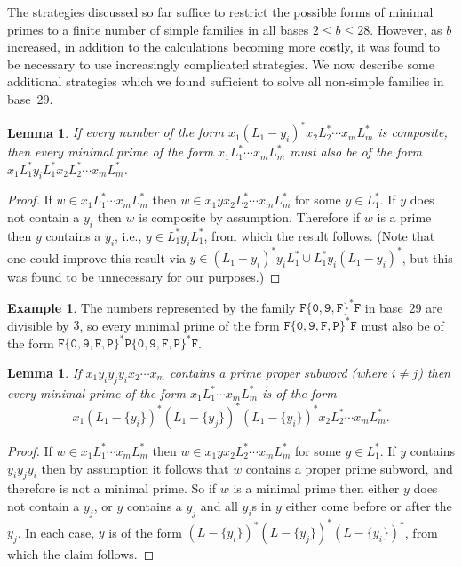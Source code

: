\documentclass[12pt]{article}
\theoremstyle{plain}
\newtheorem{lemma}[theorem]{Lemma}
\theoremstyle{definition}
\newtheorem{example}[theorem]{Example}
\newcommand{\0}{\mathtt{0}}
\newcommand{\1}{\mathtt{1}}
\newcommand{\2}{\mathtt{2}}
\newcommand{\3}{\mathtt{3}}
\newcommand{\4}{\mathtt{4}}
\newcommand{\5}{\mathtt{5}}
\newcommand{\6}{\mathtt{6}}
\newcommand{\7}{\mathtt{7}}
\newcommand{\8}{\mathtt{8}}
\newcommand{\9}{\mathtt{9}}
\begin{document}
The strategies discussed so far suffice to restrict the possible forms of minimal primes to a finite number of simple families in all bases $2\leq b\leq 28$.
However, as $b$ increased, in addition to the calculations becoming more costly, 
it was found to be necessary to use increasingly complicated strategies.
We now describe some additional strategies which we found sufficient to solve all non-simple families in base~29.
\begin{lemma}
If every number of the form\/ $x_1(L_1-y_i)^*x_2L_2^*\dotsm x_mL_m^*$ is composite, then
every minimal prime of the form\/ $x_1L_1^*\dotsm x_mL_m^*$ must also be of the form\/
$x_1L_1^*y_iL_1^*x_2L_2^*\dotsm x_mL_m^*$.
\end{lemma}
\begin{proof}
If $w\in x_1L_1^*\dotsm x_mL_m^*$ then $w\in x_1yx_2L_2^*\dotsm x_mL_m^*$ for some $y\in L_1^*$.  If $y$ does not contain a $y_i$
then $w$ is composite by assumption.  Therefore if $w$ is a prime then $y$ contains a $y_i$, i.e., $y\in L_1^*y_iL_1^*$, from which the
result follows.
(Note that one could improve this result via $y\in(L_1-y_i)^*y_iL_1^*\cup L_1^*y_i(L_1-y_i)^*$, but this was found to be unnecessary for our purposes.)
\end{proof}
\begin{example}
The numbers represented by the family $\mathtt{F}\{\0,\9,\mathtt{F}\}^*\mathtt{F}$ in base~29 are divisible by $3$,
so every minimal prime of the form $\mathtt{F}\{\0,\9,\mathtt{F},\mathtt{P}\}^*\mathtt{F}$ must also be of the form
$\mathtt{F}\{\0,\9,\mathtt{F},\mathtt{P}\}^*\mathtt{P}\{\0,\9,\mathtt{F},\mathtt{P}\}^*\mathtt{F}$.
\end{example}
\begin{lemma}
If\/ $x_1y_iy_jy_ix_2\dotsm x_m$ contains a prime proper subword (where\/ $i\neq j$) then every minimal prime of the form\/
$x_1L_1^*\dotsm x_mL_m^*$ is of the form \[x_1(L_1-\{y_i\})^*(L_1-\{y_j\})^*(L_1-\{y_i\})^*x_2L_2^*\dotsm x_mL_m^* . \]
\end{lemma}
\begin{proof}
If $w\in x_1L_1^*\dotsm x_mL_m^*$ then $w\in x_1yx_2L_2^*\dotsm x_mL_m^*$ for some $y\in L_1^*$.
If $y$ contains $y_iy_jy_i$ then by assumption it follows that $w$ contains a proper prime subword,
and therefore is not a minimal prime.  So if $w$ is a minimal prime then either $y$ does not contain
a $y_j$, or $y$ contains a $y_j$ and all $y_i$s in $y$ either come before or after the $y_j$.
In each case, $y$ is of the form $(L-\{y_i\})^*(L-\{y_j\})^*(L-\{y_i\})^*$, from which the claim follows.
\end{proof}
\end{document}
